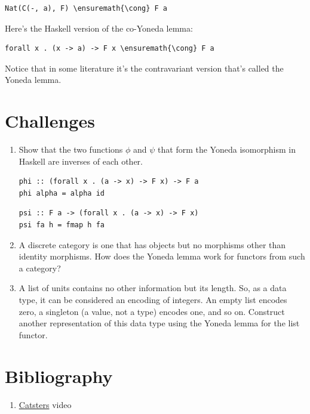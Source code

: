 \begin{Verbatim}[commandchars=\\\{\}]
Nat(C(-, a), F) \ensuremath{\cong} F a
\end{Verbatim}
Here's the Haskell version of the co-Yoneda lemma:

\begin{Verbatim}[commandchars=\\\{\}]
forall x . (x -> a) -> F x \ensuremath{\cong} F a
\end{Verbatim}
Notice that in some literature it's the contravariant version that's
called the Yoneda lemma.

\section{Challenges}\label{challenges}

\begin{enumerate}
\tightlist
\item
  Show that the two functions $\phi$ and $\psi$ that form
  the Yoneda isomorphism in Haskell are inverses of each other.

\begin{Verbatim}
phi :: (forall x . (a -> x) -> F x) -> F a
phi alpha = alpha id
\end{Verbatim}
\begin{Verbatim}
psi :: F a -> (forall x . (a -> x) -> F x)
psi fa h = fmap h fa
\end{Verbatim}
\item
  A discrete category is one that has objects but no morphisms other
  than identity morphisms. How does the Yoneda lemma work for functors
  from such a category?
\item
  A list of units \code{{[}(){]}} contains no other information but
  its length. So, as a data type, it can be considered an encoding of
  integers. An empty list encodes zero, a singleton \code{{[}(){]}} (a
  value, not a type) encodes one, and so on. Construct another
  representation of this data type using the Yoneda lemma for the list
  functor.
\end{enumerate}

\section{Bibliography}\label{bibliography}

\begin{enumerate}
\tightlist
\item
  \href{https://www.youtube.com/watch?v=TLMxHB19khE}{Catsters} video
\end{enumerate}